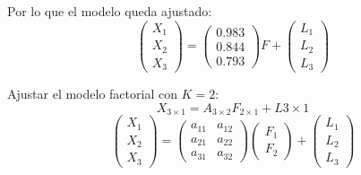\documentclass[11pt,a4paper]{article}
\begin{document}
Por lo que el modelo queda ajustado:
$$\begin{pmatrix} X_{1} \\ X_{2} \\ X_{3} \end{pmatrix} = \begin{pmatrix} 0.983 \\ 0.844 \\ 0.793 \end{pmatrix} F + \begin{pmatrix} L_{1} \\ L_{2} \\ L_{3} \end{pmatrix}$$

Ajustar el modelo factorial con $K = 2$:
$$X_{3 \times 1} = A_{3 \times 2}F_{2 \times 1} + L{3 \times 1}$$
$$\begin{pmatrix}
X_{1} \\ X_{2} \\ X_{3}
\end{pmatrix} = \begin{pmatrix}
a_{11} & a_{12} \\
a_{21} & a_{22} \\
a_{31} & a_{32}
\end{pmatrix} \begin{pmatrix}
F_{1} \\ F_{2}
\end{pmatrix} + \begin{pmatrix}
L_{1} \\ L_{2} \\ L_{3}
\end{pmatrix}$$
\end{document}
